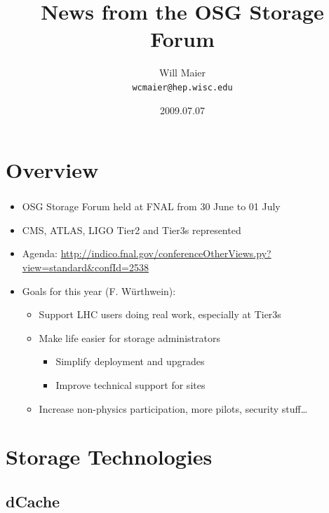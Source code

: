 \documentclass{beamer}
\title{News from the OSG Storage Forum}
\author[Maier]{
    Will Maier \\ 
    {\tt wcmaier@hep.wisc.edu}}
\institute[Wisconsin]{University of Wisconsin - High Energy Physics}
\date{2009.07.07}
\begin{document}
\begin{frame}
    \titlepage
\end{frame}

\section{Overview}
\begin{frame}
    \tableofcontents
\end{frame}

\begin{frame}
\frametitle{}
\begin{itemize}
	\item OSG Storage Forum held at FNAL from 30 June to 01 July
	\item CMS, ATLAS, LIGO Tier2 and Tier3s represented
	\item Agenda: \url{http://indico.fnal.gov/conferenceOtherViews.py?view=standard&confId=2538}
	\item Goals for this year (F. W\"urthwein):
	\begin{itemize}
		\item Support LHC users doing real work, especially at Tier3s
		\item Make life easier for storage administrators
		\begin{itemize}
			\item Simplify deployment and upgrades
			\item Improve technical support for sites
		\end{itemize}
		\item Increase non-physics participation, more pilots, security stuff\ldots{}
	\end{itemize}
\end{itemize}
\end{frame}

\section{Storage Technologies}

\subsection{dCache}

\begin{frame}
\begin{itemize}
\end{itemize}
\end{frame}
\end{document}
